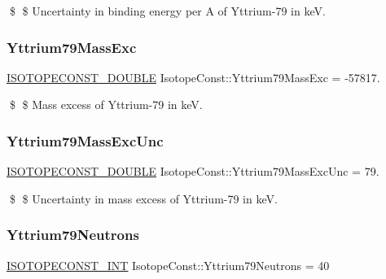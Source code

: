 \$ \$ Uncertainty in binding energy per A of Yttrium-\/79 in keV. \mbox{\label{group___isotope_const-_yttrium-_y79_gaa66f9160431a287cb749c32cd11ccafb}} 
\subsubsection{\texorpdfstring{Yttrium79\+Mass\+Exc}{Yttrium79MassExc}}
{\footnotesize\ttfamily \mbox{\hyperlink{group___isotope_const-_macros_ga8f45a7272ce02c0b4c65c44636ed719a}{I\+S\+O\+T\+O\+P\+E\+C\+O\+N\+S\+T\+\_\+\+D\+O\+U\+B\+LE}} Isotope\+Const\+::\+Yttrium79\+Mass\+Exc = -\/57817.}

\$ \$ Mass excess of Yttrium-\/79 in keV. \mbox{\label{group___isotope_const-_yttrium-_y79_gac365b95022042f00305137aa722a9d5b}} 
\subsubsection{\texorpdfstring{Yttrium79\+Mass\+Exc\+Unc}{Yttrium79MassExcUnc}}
{\footnotesize\ttfamily \mbox{\hyperlink{group___isotope_const-_macros_ga8f45a7272ce02c0b4c65c44636ed719a}{I\+S\+O\+T\+O\+P\+E\+C\+O\+N\+S\+T\+\_\+\+D\+O\+U\+B\+LE}} Isotope\+Const\+::\+Yttrium79\+Mass\+Exc\+Unc = 79.}

\$ \$ Uncertainty in mass excess of Yttrium-\/79 in keV. \mbox{\label{group___isotope_const-_yttrium-_y79_ga781037a64ef08474dc41978fac0ead33}} 
\subsubsection{\texorpdfstring{Yttrium79\+Neutrons}{Yttrium79Neutrons}}
{\footnotesize\ttfamily \mbox{\hyperlink{group___isotope_const-_macros_ga5f18360b3e99483a35c32d789e62621c}{I\+S\+O\+T\+O\+P\+E\+C\+O\+N\+S\+T\+\_\+\+I\+NT}} Isotope\+Const\+::\+Yttrium79\+Neutrons = 40}

